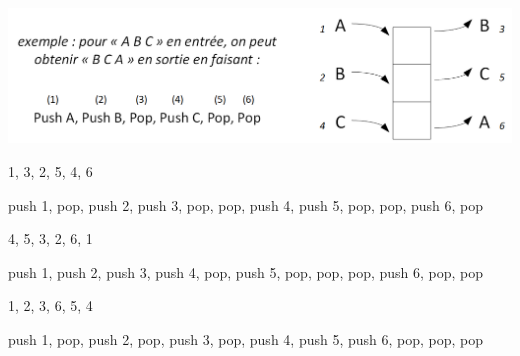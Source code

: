 \documentclass[11pt,a4paper]{article}
\begin{document}

\begin{center}

\centerline{
\includegraphics[scale=0.75]{img/exemple_ordre_pile_longueur_2.png}
}

\end{center}



\begin{center}

\begin{large}
1, 3, 2, 5, 4, 6
\end{large}
%
\begin{center}
push 1, pop, push 2, push 3, pop, pop, push 4, push 5, pop, pop, push 6, pop
\end{center}


\begin{large}
4, 5, 3, 2, 6, 1
\end{large}
%
\begin{center}
push 1, push 2, push 3, push 4, pop, push 5, pop, pop, pop, push 6, pop, pop
\end{center}

\begin{large}
1, 2, 3, 6, 5, 4
\end{large}
%
\begin{center}
push 1, pop, push 2, pop, push 3, pop, push 4, push 5, push 6, pop, pop, pop
\end{center}

\end{center}
\end{document}
